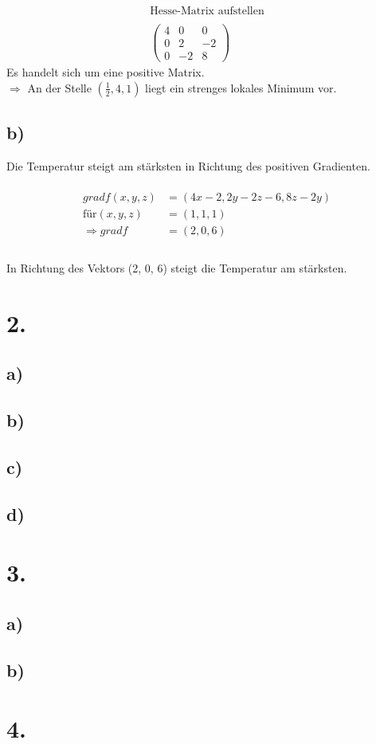 \documentclass[a4paper]{scrartcl}
\begin{document}
\begin{align}
\text{Hesse-Matrix aufstellen} \\
\\
\begin{pmatrix}
4 & 0 & 0 \\
0 & 2 & -2 \\
0 & -2 & 8 
\end{pmatrix}
\end{align}
Es handelt sich um eine positive Matrix. \\
\(\Rightarrow\) An der Stelle \((\frac{1}{2}, 4, 1)\) liegt ein strenges lokales Minimum vor.
\subsection{b)}
Die Temperatur steigt am stärksten in Richtung des positiven Gradienten. \\
\\
\begin{align}
gradf(x,y,z) &= (4x - 2, 2y - 2z - 6, 8z - 2y) \\
\text{für} (x,y,z) &= (1,1,1) \\
\Rightarrow gradf &= (2,0,6) \\
\end{align}
\\
In Richtung des Vektors (2, 0, 6) steigt die Temperatur am stärksten.
\section{2.}
\subsection{a)}
\subsection{b)}
\subsection{c)}
\subsection{d)}

\section{3.}
\subsection{a)}
\subsection{b)}
\section{4.}
\end{document}
